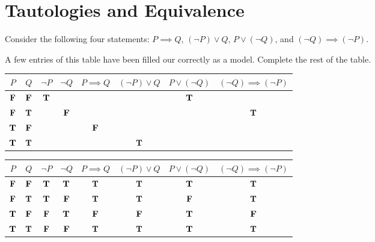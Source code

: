 	

\section{Tautologies and Equivalence}

\begin{xca}
Consider the following four statements:  $P \implies Q$,  $(\neg P) \vee Q$, $P \vee (\neg Q)$, and $(\neg Q) \implies (\neg P)$. 

A few entries of this table have been filled our correctly as a model.  Complete the rest of the table.

		\begin{table}[h!]
	\begin{center}
		\begin{tabular}{c|c|c|c|c|c|c|c} 
			$P$ & $Q$ & $\neg P$ & $\neg Q$  & $P \implies Q$ & $(\neg P) \vee Q$ &  $P \vee (\neg Q)$ & $(\neg Q) \implies (\neg P)$ \\
			\hline
			 $\F$& $\F$ & $\T$ &         &          &            &  $\T$   &   \\ \hline
			 $\F$& $\T$ &         & $\F$ &          &            &            &  $\T$  \\ \hline
			 $\T$& $\F$ &         &         &  $\F$ &            &            &     \\ \hline
			 $\T$& $\T$ &         &         &          &  $\T$   &            &      \\ 
		\end{tabular}
	\end{center}
\end{table}

\end{xca}

\begin{solutions}
	
	\begin{table}[h!]
		\begin{center}
			\begin{tabular}{c|c|c|c|c|c|c|c} 
				$P$ & $Q$ & $\neg P$ & $\neg Q$  & $P \implies Q$ & $(\neg P) \vee Q$ &  $P \vee (\neg Q)$ & $(\neg Q) \implies (\neg P)$ \\
				\hline
				$\F$& $\F$ & $\T$ & $\T$ & $\T$ & $\T$ & $\T$  &  $\T$  \\ \hline
				$\F$& $\T$ & $\T$ & $\F$ & $\T$ & $\T$ & $\F$  &  $\T$  \\ \hline
				$\T$& $\F$ & $\F$ & $\T$ & $\F$ & $\F$ & $\T$  &  $\F$   \\ \hline
				$\T$& $\T$ & $\F$ & $\F$ & $\T$ & $\T$ & $\T$ &  $\T$    \\ 
			\end{tabular}
		\end{center}
	\end{table}
\end{solutions}

